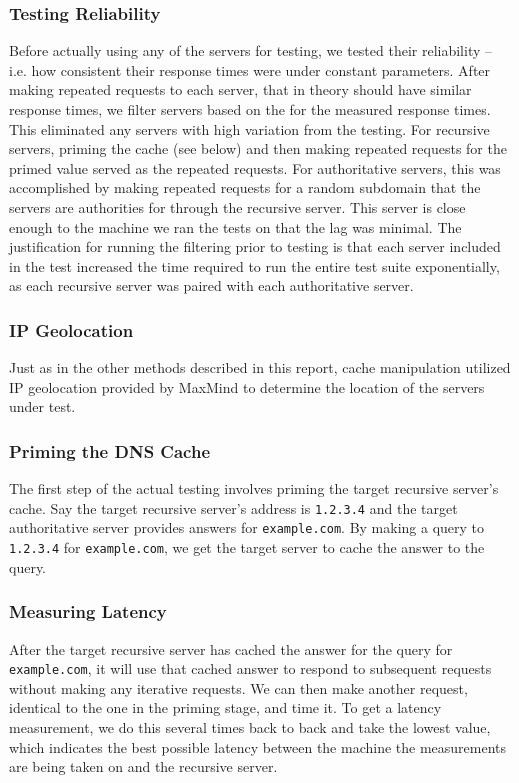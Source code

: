 \subsubsection{Testing Reliability}


Before actually using any of the servers for testing, we tested their reliability -- i.e. how consistent their response times were under constant parameters. After making repeated requests to each server, that in theory should have similar response times, we filter servers based on the \cv for the measured response times. This eliminated any servers with high variation from the testing. For recursive servers, priming the cache (see below) and then making repeated requests for the primed value served as the repeated requests. For authoritative servers, this was accomplished by making repeated requests for a random subdomain that the servers are authorities for through the \wpi recursive \dns server. This server is close enough to the machine we ran the tests on that the lag was minimal. The justification for running the filtering prior to testing is that each server included in the test increased the time required to run the entire test suite exponentially, as each recursive server was paired with each authoritative server.

\subsubsection{IP Geolocation}
Just as in the other methods described in this report, \dns cache manipulation utilized IP geolocation provided by MaxMind to determine the location of the servers under test.

\subsubsection{Priming the DNS Cache} 
The first step of the actual testing involves priming the target recursive server's cache. Say the target recursive server's \ip address is \texttt{1.2.3.4} and the target authoritative server provides answers for \texttt{example.com}. By making a \dns query to \texttt{1.2.3.4} for \texttt{example.com}, we get the target \dns server to cache the answer to the query.

\subsubsection{Measuring Latency} 
After the target recursive server has cached the answer for the query for \texttt{example.com}, it will use that cached answer to respond to subsequent requests without making any iterative requests. We can then make another request, identical to the one in the priming stage, and time it. To get a latency measurement, we do this several times back to back and take the lowest value, which indicates the best possible latency between the machine the measurements are being taken on and the recursive server.

